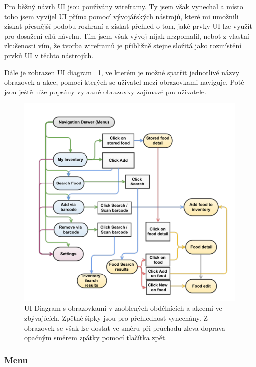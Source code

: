 \documentclass[thesis=B,czech]{FITthesis}[2013/10/20]
\begin{document}
Pro běžný návrh UI jsou používány wireframy. Ty jsem však vynechal a místo toho jsem vyvíjel UI přímo pomocí vývojářských nástrojů, které mi umožnili získat přesnější podobu rozhraní a získat přehled o tom, jaké prvky UI lze využít pro dosažení cílů návrhu. Tím jsem však vývoj nijak nezpomalil, neboť z vlastní zkušenosti vím, že tvorba wireframů je přibližně stejne složitá jako rozmístění prvků UI v těchto nástrojích.

Dále je zobrazen UI diagram ~\ref{fig:UIDiagram}, ve kterém je možné spatřit jednotlivé názvy obrazovek a akce, pomocí kterých se uživatel mezi obrazovkami naviguje. Poté jsou ještě níže popsány vybrané obrazovky zajímavé pro uživatele.

\begin{figure}[H]
  \centering
  \includegraphics[scale=0.70]{diagrams/ui.pdf}
  \caption{UI Diagram s obrazovkami v zaoblených obdélnících a akcemi ve zbývajících. Zpětné šipky jsou pro přehlednost vynechány. Z obrazovek se však lze dostat ve směru při průchodu zleva doprava opačným směrem zpátky pomocí tlačítka zpět.}
  \label{fig:UIDiagram}
\end{figure}

\clearpage

\subsubsection{Menu}
\end{document}
